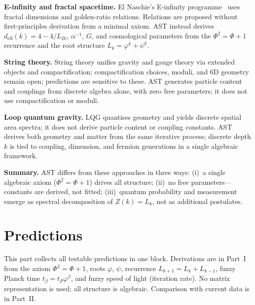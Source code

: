 \documentclass[12pt,a4paper]{article}
\begin{document}
\textbf{E-infinity and fractal spacetime.} El Naschie's E-infinity programme~\cite{ElNaschie2004} uses fractal dimensions and golden-ratio relations. Relations are proposed without first-principles derivation from a minimal axiom. AST instead derives $d_{\mathrm{eff}}(k) = 4 - 4/L_{2k}$, $\alpha^{-1}$, $G$, and cosmological parameters from the $\Phi^2 = \Phi + 1$ recurrence and the root structure $L_k = \varphi^k + \psi^k$.

\textbf{String theory.} String theory unifies gravity and gauge theory via extended objects and compactification; compactification choices, moduli, and 6D geometry remain open; predictions are sensitive to these. AST generates particle content and couplings from discrete algebra alone, with zero free parameters; it does not use compactification or moduli.

\textbf{Loop quantum gravity.} LQG quantises geometry and yields discrete spatial area spectra; it does not derive particle content or coupling constants. AST derives both geometry and matter from the same iterative process; discrete depth $k$ is tied to coupling, dimension, and fermion generations in a single algebraic framework.

\textbf{Summary.} AST differs from these approaches in three ways: (i)~a single algebraic axiom ($\Phi^2 = \Phi + 1$) drives all structure; (ii)~no free parameters---constants are derived, not fitted; (iii)~quantum probability and measurement emerge as spectral decomposition of $Z(k) = L_k$, not as additional postulates.



\part{Predictions}
\label{part:predictions}
\label{part:assessment}

\noindent This part collects all testable predictions in one block. Derivations are in Part~I from the axiom $\Phi^2 = \Phi + 1$, roots $\varphi$, $\psi$, recurrence $L_{k+1} = L_k + L_{k-1}$, fuzzy Planck time $t_\beta = t_P\varphi^\beta$, and fuzzy speed of light (iteration rate). No matrix representation is used; all structure is algebraic. Comparison with current data is in Part~II.

\end{document}
